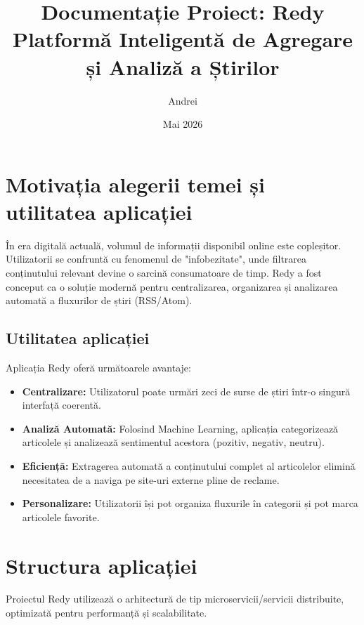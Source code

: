 \documentclass[12pt,a4paper]{article}
\title{Documentație Proiect: Redy\\ \large Platformă Inteligentă de Agregare și Analiză a Știrilor}
\author{Andrei}
\date{Mai 2026}
\begin{document}
\maketitle
\newpage

\tableofcontents
\newpage

\section{Motivația alegerii temei și utilitatea aplicației}

În era digitală actuală, volumul de informații disponibil online este copleșitor. Utilizatorii se confruntă cu fenomenul de "infobezitate", unde filtrarea conținutului relevant devine o sarcină consumatoare de timp. Redy a fost conceput ca o soluție modernă pentru centralizarea, organizarea și analizarea automată a fluxurilor de știri (RSS/Atom).

\subsection{Utilitatea aplicației}
Aplicația Redy oferă următoarele avantaje:
\begin{itemize}
    \item \textbf{Centralizare:} Utilizatorul poate urmări zeci de surse de știri într-o singură interfață coerentă.
    \item \textbf{Analiză Automată:} Folosind Machine Learning, aplicația categorizează articolele și analizează sentimentul acestora (pozitiv, negativ, neutru).
    \item \textbf{Eficiență:} Extragerea automată a conținutului complet al articolelor elimină necesitatea de a naviga pe site-uri externe pline de reclame.
    \item \textbf{Personalizare:} Utilizatorii își pot organiza fluxurile în categorii și pot marca articolele favorite.
\end{itemize}

\section{Structura aplicației}

Proiectul Redy utilizează o arhitectură de tip microservicii/servicii distribuite, optimizată pentru performanță și scalabilitate.
\end{document}
